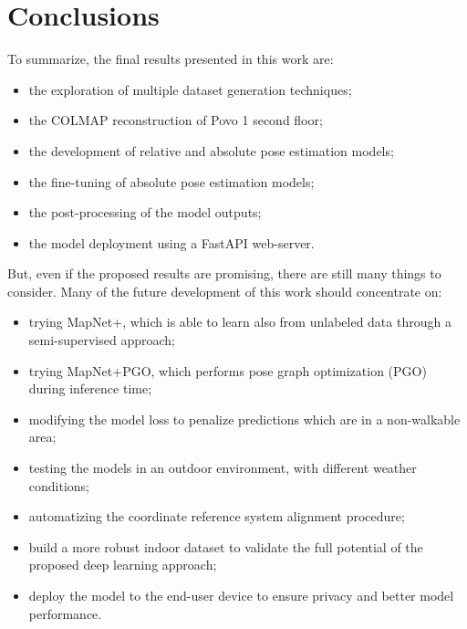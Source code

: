 \section{Conclusions}
To summarize, the final results presented in this work are:
\begin{itemize}
    \item the exploration of multiple dataset generation techniques;
    \item the COLMAP reconstruction of Povo 1 second floor;
    \item the development of relative and absolute pose estimation models;
    \item the fine-tuning of absolute pose estimation models;
    \item the post-processing of the model outputs;
    \item the model deployment using a FastAPI web-server. 
\end{itemize}

But, even if the proposed results are promising, there are still many things to consider.
Many of the future development of this work should concentrate on:
\begin{itemize}
    \item trying MapNet+, which is able to learn also from unlabeled data through a semi-supervised approach;
    \item trying MapNet+PGO, which performs pose graph optimization (PGO) during inference time;
    \item modifying the model loss to penalize predictions which are in a non-walkable area;
    \item testing the models in an outdoor environment, with different weather conditions;
    \item automatizing the coordinate reference system alignment procedure;
    \item build a more robust indoor dataset to validate the full potential of the proposed deep learning approach;
    \item deploy the model to the end-user device to ensure privacy and better model performance.
\end{itemize}
